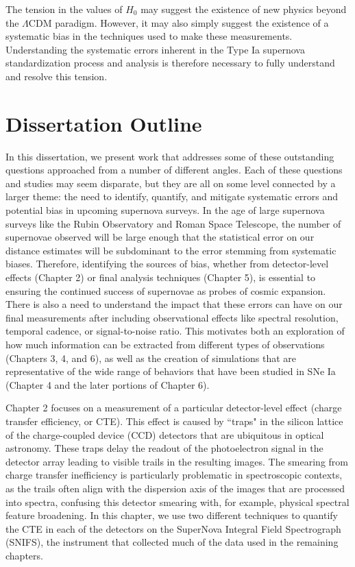 The tension in the values of $H_0$ may suggest the existence of new physics beyond the $\Lambda$CDM paradigm. However, it may also simply suggest the existence of a systematic bias in the techniques used to make these measurements. Understanding the systematic errors inherent in the Type Ia supernova standardization process and analysis is therefore necessary to fully understand and resolve this tension.

\section{Dissertation Outline}
In this dissertation, we present work that addresses some of these outstanding questions approached from a number of different angles. Each of these questions and studies may seem disparate, but they are all on some level connected by a larger theme: the need to identify, quantify, and mitigate systematic errors and potential bias in upcoming supernova surveys. In the age of large supernova surveys like the Rubin Observatory and Roman Space Telescope, the number of supernovae observed will be large enough that the statistical error on our distance estimates will be subdominant to the error stemming from systematic biases. Therefore, identifying the sources of bias, whether from detector-level effects (Chapter 2) or final analysis techniques (Chapter 5), is essential to ensuring the continued success of supernovae as probes of cosmic expansion. There is also a need to understand the impact that these errors can have on our final measurements after including observational effects like spectral resolution, temporal cadence, or signal-to-noise ratio. This motivates both an exploration of how much information can be extracted from different types of observations (Chapters 3, 4, and 6), as well as the creation of simulations that are representative of the wide range of behaviors that have been studied in SNe Ia (Chapter 4 and the later portions of Chapter 6).

Chapter 2 focuses on a measurement of a particular detector-level effect (charge transfer efficiency, or CTE). This effect is caused by ``traps" in the silicon lattice of the charge-coupled device (CCD) detectors that are ubiquitous in optical astronomy. These traps delay the readout of the photoelectron signal in the detector array leading to visible trails in the resulting images. The smearing from charge transfer inefficiency is particularly problematic in spectroscopic contexts, as the trails often align with the dispersion axis of the images that are processed into spectra, confusing this detector smearing with, for example, physical spectral feature broadening. In this chapter, we use two different techniques to quantify the CTE in each of the detectors on the SuperNova Integral Field Spectrograph (SNIFS), the instrument that collected much of the data used in the remaining chapters.

